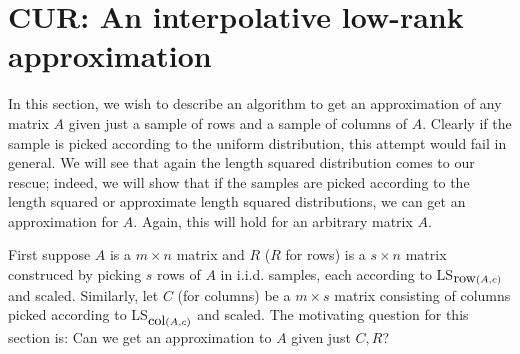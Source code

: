 \documentclass{book}
\numberwithin{exercise}{chapter}
\begin{document}
\begin{center}
\end{center}




\section{CUR: An interpolative low-rank approximation}

In this section, we wish to describe an algorithm to get an approximation of any matrix $A$ given just a sample of rows and a sample of columns of $A$. Clearly if the sample is picked according to the uniform distribution, this attempt would fail in general. We will see that again the length squared distribution comes to our rescue; indeed, we will show that if the samples are picked according to the length squared or approximate length squared distributions, we can get an approximation for $A$. Again, this will hold for an arbitrary matrix $A$.

First suppose $A$ is a $m\times n$ matrix and $R$ ($R$ for rows) is a $s\times n$ matrix construced by picking $s$ rows of $A$ in i.i.d. samples, each according to LS$_{\hbox{row}(A,c)}$ and scaled. Similarly, let $C$
(for columns) be a $m\times s$ matrix consisting of columns picked according to LS$_{\hbox{col}(A,c)}$ and scaled. The motivating question for this section is: Can we get an approximation to $A$ given just $C,R$?
\end{document}

